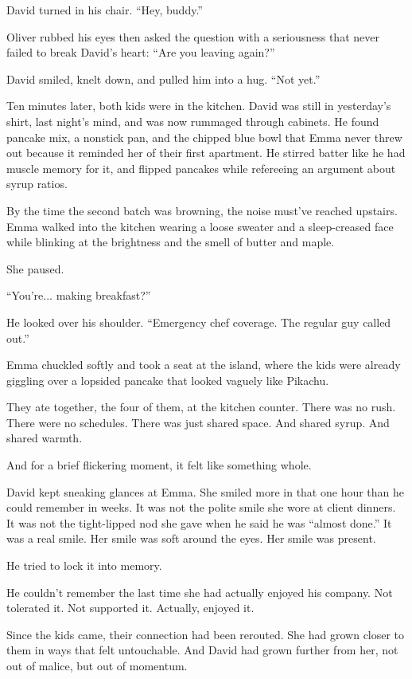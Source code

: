 David turned in his chair. ``Hey, buddy.''

Oliver rubbed his eyes then asked the question with a seriousness that never failed to break 
David’s heart: ``Are you leaving again?''

David smiled, knelt down, and pulled him into a hug. ``Not yet.''

Ten minutes later, both kids were in the kitchen. David was still in yesterday’s shirt, last night’s mind, and was 
now rummaged through cabinets. He found pancake mix, a nonstick pan, and the chipped blue bowl that Emma never 
threw out because it reminded her of their first apartment. 
He stirred batter like he had muscle memory for it,  and flipped pancakes while refereeing an 
argument about syrup ratios.

By the time the second batch was browning, the noise must’ve reached upstairs. Emma walked into the kitchen 
wearing a loose sweater and a sleep-creased face while blinking at the brightness and the smell of butter and maple.

She paused.

``You’re... making breakfast?''

He looked over his shoulder. ``Emergency chef coverage. The regular guy called out.''

Emma chuckled softly and took a seat at the island, where the kids were already giggling over a lopsided 
pancake that looked vaguely like Pikachu.

They ate together, the four of them, at the kitchen counter. 
There was no rush. 
There were no schedules. 
There was just shared space. 
And shared syrup. 
And shared warmth.

And for a brief flickering moment, it felt like something whole.

David kept sneaking glances at Emma. 
She smiled more in that one hour than he could remember in weeks. 
It was not the polite smile she wore at client dinners.
It was not the tight-lipped nod she gave when he said he was ``almost done.''
It was a real smile. Her smile was soft around the eyes. Her smile was present.

He tried to lock it into memory.

He couldn’t remember the last time she had actually enjoyed his company. Not tolerated it. Not supported it. 
Actually, enjoyed it.

Since the kids came, their connection had been rerouted. 
She had grown closer to them in ways that felt untouchable. 
And David had grown further from her, not out of malice, but out of momentum.

